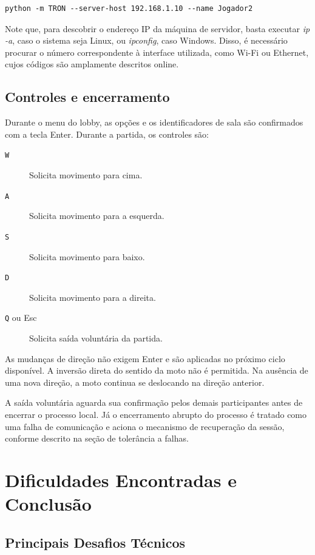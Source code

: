 \documentclass[11pt,a4paper]{article}
\begin{document}
\begin{description}
\begin{verbatim}
python -m TRON --server-host 192.168.1.10 --name Jogador2
\end{verbatim}

Note que, para descobrir o endereço IP da máquina de servidor, basta executar \textit{ip -a}, caso o sistema seja Linux, ou \textit{ipconfig}, caso Windows. Disso, é necessário procurar o número correspondente à interface utilizada, como Wi-Fi ou Ethernet, cujos códigos são amplamente descritos online.

\subsection{Controles e encerramento}

Durante o menu do lobby, as opções e os identificadores de sala são confirmados com a tecla Enter. Durante a partida, os controles são:

\begin{description}
    \item[\texttt{W}] Solicita movimento para cima.
    \item[\texttt{A}] Solicita movimento para a esquerda.
    \item[\texttt{S}] Solicita movimento para baixo.
    \item[\texttt{D}] Solicita movimento para a direita.
    \item[\texttt{Q} ou Esc] Solicita saída voluntária da partida.
\end{description}

As mudanças de direção não exigem Enter e são aplicadas no próximo ciclo disponível. A inversão direta do sentido da moto não é permitida. Na ausência de uma nova direção, a moto continua se deslocando na direção anterior.

A saída voluntária aguarda sua confirmação pelos demais participantes antes de encerrar o processo local. Já o encerramento abrupto do processo é tratado como uma falha de comunicação e aciona o mecanismo de recuperação da sessão, conforme descrito na seção de tolerância a falhas.

\section{Dificuldades Encontradas e Conclusão}

\subsection{Principais Desafios Técnicos}


\end{description}
\end{document}
